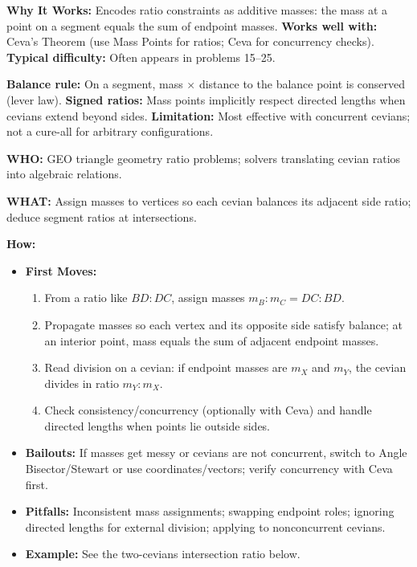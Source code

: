 \documentclass[12pt]{article}
\begin{document}
\textbf{Why It Works:} Encodes ratio constraints as additive masses: the mass at a point on a segment equals the sum of endpoint masses.
\textbf{Works well with:} Ceva's Theorem (use Mass Points for ratios; Ceva for concurrency checks).
\textbf{Typical difficulty:} Often appears in problems 15--25.

\textbf{Balance rule:} On a segment, mass $\times$ distance to the balance point is conserved (lever law).
\textbf{Signed ratios:} Mass points implicitly respect directed lengths when cevians extend beyond sides.
\textbf{Limitation:} Most effective with concurrent cevians; not a cure-all for arbitrary configurations.

\textbf{WHO:} GEO triangle geometry ratio problems; solvers translating cevian ratios into algebraic relations.

\textbf{WHAT:} Assign masses to vertices so each cevian balances its adjacent side ratio; deduce segment ratios at intersections.


\textbf{How:}
\begin{itemize}
    \item \textbf{First Moves:}
    \begin{enumerate}[nosep]
        \item From a ratio like $BD:DC$, assign masses $m_B:m_C = DC:BD$.
        \item Propagate masses so each vertex and its opposite side satisfy balance; at an interior point, mass equals the sum of adjacent endpoint masses.
        \item Read division on a cevian: if endpoint masses are $m_X$ and $m_Y$, the cevian divides in ratio $m_Y:m_X$.
        \item Check consistency/concurrency (optionally with Ceva) and handle directed lengths when points lie outside sides.
    \end{enumerate}
    \item \textbf{Bailouts:} If masses get messy or cevians are not concurrent, switch to Angle Bisector/Stewart or use coordinates/vectors; verify concurrency with Ceva first.
    \item \textbf{Pitfalls:} Inconsistent mass assignments; swapping endpoint roles; ignoring directed lengths for external division; applying to nonconcurrent cevians.
    \item \textbf{Example:} See the two-cevians intersection ratio below.
\end{itemize}

\begin{center}
\end{center}
\end{document}
